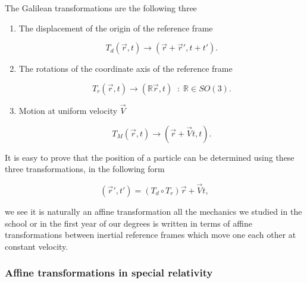                 The Galilean transformations are the following three

                \begin{enumerate}
                    \item The displacement of the origin of the reference frame 

                    \begin{equation}
                        T_d (\Vec{r},t) \rightarrow (\Vec{r} + \Vec{r}', t + t').
                    \end{equation}

                    \item The rotations of the coordinate axis of the reference frame 

                    \begin{equation}
                        T_r(\Vec{r},t) \rightarrow \left(\mathbb{R}\Vec{r},t\right)\;\;:\;\mathbb{R}\in SO(3).
                    \end{equation}

                    \item  Motion at uniform velocity $\Vec{V}$

                    \begin{equation}
                        T_M(\Vec{r},t) \rightarrow (\Vec{r}+\Vec{V}t,t).
                    \end{equation}
                \end{enumerate}

                It is easy to prove that the position of a particle can be determined using these three transformations, in the following form

                \begin{equation}
                    (\Vec{r}',t') = \left(T_d \circ T_r \right)\Vec{r} + \Vec{V}t,
                \end{equation}

                we see it is naturally an affine transformation all the mechanics we studied in the school or in the first year of our degrees is written in terms of affine transformations between inertial reference frames which move one each other at constant velocity.
            

            \subsubsection{Affine transformations in special relativity}

